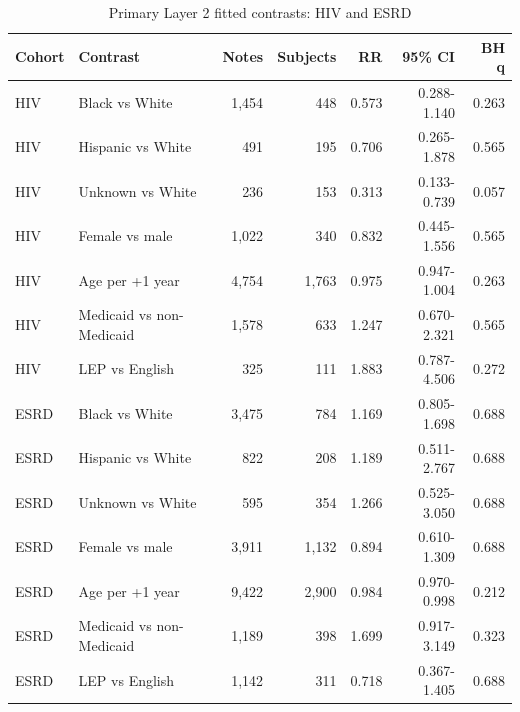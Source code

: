 \documentclass[unnumsec,webpdf,contemporary,large]{oup-authoring-template}
\begin{document}
\begin{table}[H]
\caption{Primary Layer 2 fitted contrasts: HIV and ESRD}
\label{tab:s_layer2c}
\centering
\small
\begin{tabular}{llrrrrr}
\toprule
Cohort & Contrast & Notes & Subjects & RR & 95\% CI & BH q \\
\midrule
HIV & Black vs White & 1,454 & 448 & 0.573 & 0.288-1.140 & 0.263 \\
HIV & Hispanic vs White & 491 & 195 & 0.706 & 0.265-1.878 & 0.565 \\
HIV & Unknown vs White & 236 & 153 & 0.313 & 0.133-0.739 & 0.057 \\
HIV & Female vs male & 1,022 & 340 & 0.832 & 0.445-1.556 & 0.565 \\
HIV & Age per +1 year & 4,754 & 1,763 & 0.975 & 0.947-1.004 & 0.263 \\
HIV & Medicaid vs non-Medicaid & 1,578 & 633 & 1.247 & 0.670-2.321 & 0.565 \\
HIV & LEP vs English & 325 & 111 & 1.883 & 0.787-4.506 & 0.272 \\
ESRD & Black vs White & 3,475 & 784 & 1.169 & 0.805-1.698 & 0.688 \\
ESRD & Hispanic vs White & 822 & 208 & 1.189 & 0.511-2.767 & 0.688 \\
ESRD & Unknown vs White & 595 & 354 & 1.266 & 0.525-3.050 & 0.688 \\
ESRD & Female vs male & 3,911 & 1,132 & 0.894 & 0.610-1.309 & 0.688 \\
ESRD & Age per +1 year & 9,422 & 2,900 & 0.984 & 0.970-0.998 & 0.212 \\
ESRD & Medicaid vs non-Medicaid & 1,189 & 398 & 1.699 & 0.917-3.149 & 0.323 \\
ESRD & LEP vs English & 1,142 & 311 & 0.718 & 0.367-1.405 & 0.688 \\
\bottomrule
\end{tabular}
\end{table}
\end{document}

